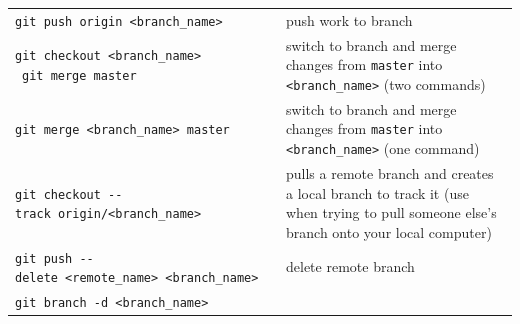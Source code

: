 \documentclass[]{book}
\begin{document}
\begin{longtable}[]{@{}ll@{}}
\begin{minipage}[t]{0.13\columnwidth}\raggedright\strut
\texttt{git\ push\ origin\ \textless{}branch\_name\textgreater{}}\strut
\end{minipage} & \begin{minipage}[t]{0.22\columnwidth}\raggedright\strut
push work to branch\strut
\end{minipage}\tabularnewline
\begin{minipage}[t]{0.13\columnwidth}\raggedright\strut
\texttt{git\ checkout\ \textless{}branch\_name\textgreater{}}
~\texttt{git\ merge\ master}\strut
\end{minipage} & \begin{minipage}[t]{0.22\columnwidth}\raggedright\strut
switch to branch and merge changes from \texttt{master} into
\texttt{\textless{}branch\_name\textgreater{}} (two commands)\strut
\end{minipage}\tabularnewline
\begin{minipage}[t]{0.13\columnwidth}\raggedright\strut
\texttt{git\ merge\ \textless{}branch\_name\textgreater{}\ master}\strut
\end{minipage} & \begin{minipage}[t]{0.22\columnwidth}\raggedright\strut
switch to branch and merge changes from \texttt{master} into
\texttt{\textless{}branch\_name\textgreater{}} (one command)\strut
\end{minipage}\tabularnewline
\begin{minipage}[t]{0.13\columnwidth}\raggedright\strut
\texttt{git\ checkout\ -\/-track\ origin/\textless{}branch\_name\textgreater{}}\strut
\end{minipage} & \begin{minipage}[t]{0.22\columnwidth}\raggedright\strut
pulls a remote branch and creates a local branch to track it (use when
trying to pull someone else's branch onto your local computer)\strut
\end{minipage}\tabularnewline
\begin{minipage}[t]{0.13\columnwidth}\raggedright\strut
\texttt{git\ push\ -\/-delete\ \textless{}remote\_name\textgreater{}\ \textless{}branch\_name\textgreater{}}\strut
\end{minipage} & \begin{minipage}[t]{0.22\columnwidth}\raggedright\strut
delete remote branch\strut
\end{minipage}\tabularnewline
\begin{minipage}[t]{0.13\columnwidth}\raggedright\strut
\texttt{git\ branch\ -d\ \textless{}branch\_name\textgreater{}}\strut

\end{minipage}
\end{longtable}
\end{document}
